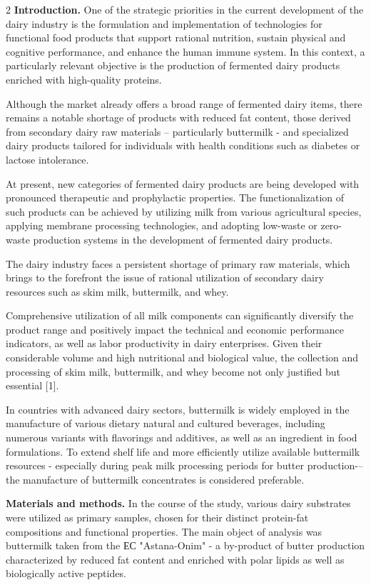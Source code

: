 \begin{multicols}{2}
{\bfseries Introduction.} One of the strategic priorities in the current
development of the dairy industry is the formulation and implementation
of technologies for functional food products that support rational
nutrition, sustain physical and cognitive performance, and enhance the
human immune system. In this context, a particularly relevant objective
is the production of fermented dairy products enriched with high-quality
proteins.

Although the market already offers a broad range of fermented dairy
items, there remains a notable shortage of products with reduced fat
content, those derived from secondary dairy raw materials --
particularly buttermilk - and specialized dairy products tailored for
individuals with health conditions such as diabetes or lactose
intolerance.

At present, new categories of fermented dairy products are being
developed with pronounced therapeutic and prophylactic properties. The
functionalization of such products can be achieved by utilizing milk
from various agricultural species, applying membrane processing
technologies, and adopting low-waste or zero-waste production systems in
the development of fermented dairy products.

The dairy industry faces a persistent shortage of primary raw materials,
which brings to the forefront the issue of rational utilization of
secondary dairy resources such as skim milk, buttermilk, and whey.

Comprehensive utilization of all milk components can significantly
diversify the product range and positively impact the technical and
economic performance indicators, as well as labor productivity in dairy
enterprises. Given their considerable volume and high nutritional and
biological value, the collection and processing of skim milk,
buttermilk, and whey become not only justified but essential {[}1{]}.

In countries with advanced dairy sectors, buttermilk is widely employed
in the manufacture of various dietary natural and cultured beverages,
including numerous variants with flavorings and additives, as well as an
ingredient in food formulations. To extend shelf life and more
efficiently utilize available buttermilk resources - especially during
peak milk processing periods for butter production-\/-- the manufacture
of buttermilk concentrates is considered preferable.

{\bfseries Materials and methods.} In the course of the study, various
dairy substrates were utilized as primary samples, chosen for their
distinct protein-fat compositions and functional properties. The main
object of analysis was buttermilk taken from the ЕС "Astana-Onim" - a
by-product of butter production characterized by reduced fat content and
enriched with polar lipids as well as biologically active peptides.


\end{multicols}
